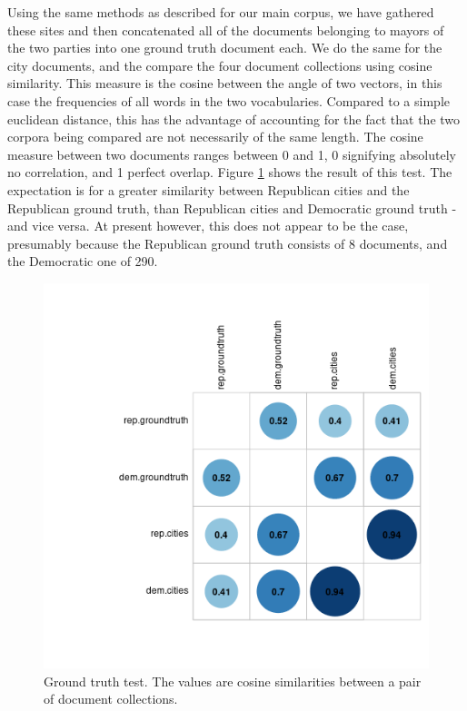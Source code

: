 \documentclass[11pt]{article}
\begin{document}
Using the same methods as described for our main corpus, we have gathered these sites and then concatenated all of the documents belonging to mayors of the two parties into one ground truth document each. We do the same for the city documents, and the compare the four document collections using cosine similarity. This measure is the cosine between the angle of two vectors, in this case the frequencies of all words in the two vocabularies. Compared to a simple euclidean distance, this has the advantage of accounting for the fact that the two corpora being compared are not necessarily of the same length. The cosine measure between two documents ranges between 0 and 1, 0 signifying absolutely no correlation, and 1 perfect overlap. Figure \ref{groundtruth} shows the result of this test. The expectation is for a greater similarity between Republican cities and the Republican ground truth, than Republican cities and Democratic ground truth - and vice versa. At present however, this does not appear to be the case, presumably because the Republican ground truth consists of 8 documents, and the Democratic one of 290.

\begin{figure}[htp]
	\centering %
	\includegraphics[width=\linewidth]{figures/groundtruth_corrplot.png}
	\caption{Ground truth test. The values are cosine similarities between a pair of document collections.}
	\label{groundtruth}
\end{figure}
\end{document}
